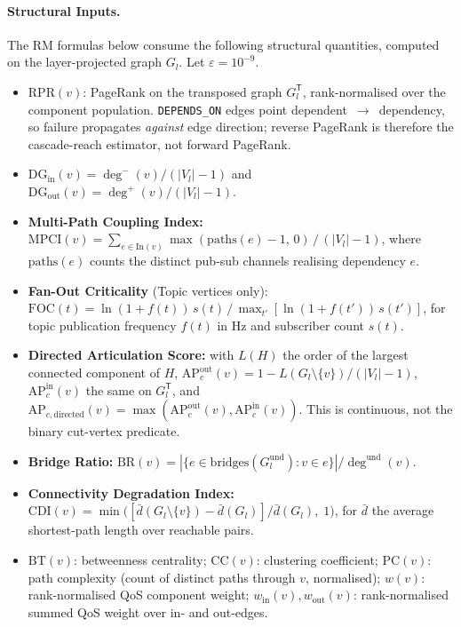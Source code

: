 \paragraph{Structural Inputs.}
The RM formulas below consume the following structural quantities, computed on the
layer-projected graph $G_l$. Let $\varepsilon = 10^{-9}$.
\begin{itemize}
    \item $\mathrm{RPR}(v)$: PageRank on the transposed graph $G_l^{\mathsf T}$, rank-normalised over the component population. \texttt{DEPENDS\_ON} edges point dependent~$\to$~dependency, so failure propagates \emph{against} edge direction; reverse PageRank is therefore the cascade-reach estimator, not forward PageRank.
    \item $\mathrm{DG}_{\text{in}}(v) = \deg^{-}(v) / (|V_l| - 1)$ and $\mathrm{DG}_{\text{out}}(v) = \deg^{+}(v) / (|V_l| - 1)$.
    \item \textbf{Multi-Path Coupling Index:} $\mathrm{MPCI}(v) = \sum_{e \in \mathrm{In}(v)} \max(\mathrm{paths}(e) - 1,\, 0) \,/\, (|V_l| - 1)$, where $\mathrm{paths}(e)$ counts the distinct pub-sub channels realising dependency $e$.
    \item \textbf{Fan-Out Criticality} (Topic vertices only): $\mathrm{FOC}(t) = \ln(1 + f(t))\, s(t) \,/\, \max_{t'} [\ln(1 + f(t'))\, s(t')]$, for topic publication frequency $f(t)$ in Hz and subscriber count $s(t)$.
    \item \textbf{Directed Articulation Score:} with $L(H)$ the order of the largest connected component of $H$, $\mathrm{AP}_{c}^{\text{out}}(v) = 1 - L(G_l \setminus \{v\})/(|V_l|-1)$, $\mathrm{AP}_{c}^{\text{in}}(v)$ the same on $G_l^{\mathsf T}$, and $\mathrm{AP}_{c,\text{directed}}(v) = \max(\mathrm{AP}_c^{\text{out}}(v), \mathrm{AP}_c^{\text{in}}(v))$. This is continuous, not the binary cut-vertex predicate.
    \item \textbf{Bridge Ratio:} $\mathrm{BR}(v) = |\{e \in \mathrm{bridges}(G_l^{\text{und}}) : v \in e\}| / \deg^{\text{und}}(v)$.
    \item \textbf{Connectivity Degradation Index:} $\mathrm{CDI}(v) = \min\!\big( [\bar{d}(G_l \setminus \{v\}) - \bar{d}(G_l)] / \bar{d}(G_l),\; 1 \big)$, for $\bar{d}$ the average shortest-path length over reachable pairs.
    \item $\mathrm{BT}(v)$: betweenness centrality; $\mathrm{CC}(v)$: clustering coefficient; $\mathrm{PC}(v)$: path complexity (count of distinct paths through $v$, normalised); $w(v)$: rank-normalised QoS component weight; $w_{\text{in}}(v), w_{\text{out}}(v)$: rank-normalised summed QoS weight over in- and out-edges.
\end{itemize}

